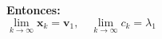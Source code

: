 \documentclass[9pt, aspectratio=169]{beamer}
\begin{document}
\begin{frame}
\begin{columns}[t]
		\textbf{Entonces:}
		\[ \lim_{k \rightarrow \infty} \bm{x}_k = \bm{v}_1, \quad \lim_{k \rightarrow \infty} c_k = \lambda_1 \]




	\end{columns}
\end{frame}

\end{document}
